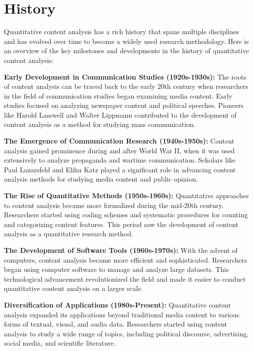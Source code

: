 \documentclass[
  b5paper]{book}
\begin{document}
\hypertarget{history-1}{%
\section{History}\label{history-1}}

Quantitative content analysis has a rich history that spans multiple disciplines and has evolved over time to become a widely used research methodology. Here is an overview of the key milestones and developments in the history of quantitative content analysis:

\textbf{Early Development in Communication Studies (1920s-1930s):} The roots of content analysis can be traced back to the early 20th century when researchers in the field of communication studies began examining media content. Early studies focused on analyzing newspaper content and political speeches. Pioneers like Harold Lasswell and Walter Lippmann contributed to the development of content analysis as a method for studying mass communication.

\textbf{The Emergence of Communication Research (1940s-1950s):} Content analysis gained prominence during and after World War II, when it was used extensively to analyze propaganda and wartime communication. Scholars like Paul Lazarsfeld and Elihu Katz played a significant role in advancing content analysis methods for studying media content and public opinion.

\textbf{The Rise of Quantitative Methods (1950s-1960s):} Quantitative approaches to content analysis became more formalized during the mid-20th century. Researchers started using coding schemes and systematic procedures for counting and categorizing content features. This period saw the development of content analysis as a quantitative research method.

\textbf{The Development of Software Tools (1960s-1970s):} With the advent of computers, content analysis became more efficient and sophisticated. Researchers began using computer software to manage and analyze large datasets. This technological advancement revolutionized the field and made it easier to conduct quantitative content analysis on a larger scale.

\textbf{Diversification of Applications (1980s-Present):} Quantitative content analysis expanded its applications beyond traditional media content to various forms of textual, visual, and audio data. Researchers started using content analysis to study a wide range of topics, including political discourse, advertising, social media, and scientific literature.
\end{document}
